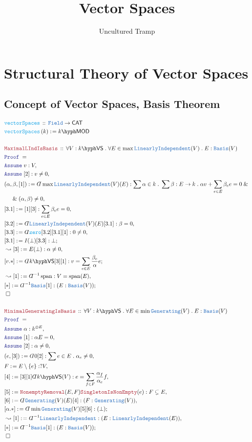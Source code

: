 \documentclass[12pt]{scrartcl}%
\title{Vector Spaces}
\author{Uncultured Tramp}
\newcommand{\TYPE}[1]{\textcolor{NavyBlue}{\mathtt{#1}}}%
\newcommand{\FUNC}[1]{\textcolor{Cerulean}{\mathtt{#1}}}%
\newcommand{\LOGIC}[1]{\textcolor{Blue}{\mathtt{#1}}}%
\newcommand{\THM}[1]{\textcolor{Maroon}{\mathtt{#1}}}%
\renewcommand{\.}{\; . \;} %
\newcommand{\de}{: \kern 0.1pc =} %
\newcommand{\Act}[1]{\left( #1 \right)} %
\newcommand{\Theorem}[2]{& \THM{#1} \, :: \, #2 \\ & \Proof = \\ } %
\newcommand{\DeclareFunc}[2]{& \FUNC{#1} \, :: \, #2 \\}%
\newcommand{\DefineFunc}[3]{&  \FUNC{#1}\Act{#2} \de #3 \\}%
\newcommand{\NewLine}{\\ & \kern 1pc}%
\newcommand{\Page}[1]{ \begin{align*} #1 \end{align*}  }%
\newcommand{ \bd }{ \ByDef }%
\renewcommand{\And}{\; \& \;}%
\newcommand{\Say}[3]{& #1 \de #2 : #3, \\} %
\newcommand{\Conclude}[3]{& #1 \de #2 : #3; \\}%
\newcommand{\Derive}[3]{& \leadsto #1 \de #2 : #3, \\} %
\newcommand{\Assume}[2]{& \LOGIC{Assume} \; #1 : #2, \\} %
\newcommand{\QED}{\; \square} %
\newcommand{\EndProof}{& \QED \\} %
\newcommand{\ByDef}{\rotatebox[origin=c]{-180}{$D$}}%
\newcommand{\Proof}{\LOGIC{Proof} \; } %
\newcommand{\CAT}{\mathsf{CAT}} %
\newcommand{\LI}{\TYPE{LinearlyIndependent}}
\DeclareMathOperator{\Span}{span} %
\newcommand{\VS}[1]{#1\hyph\mathsf{VS}} %
\newcommand{\LMOD}[1]{#1\hyph\mathsf{MOD}} %
\begin{document}
\maketitle
\normalsize
\newpage
\tableofcontents
\newpage
\section{Structural Theory of Vector Spaces}
\subsection{Concept of Vector Spaces, Basis Theorem}
\Page{
	\DeclareFunc{vectorSpaces}{\TYPE{Field} \to \CAT}
	\DefineFunc{vectorSpaces}{k}{\LMOD{k}}
	\\
	\Theorem{MaximalLIndIsBasis}
	{
		\forall V : \VS{k} \.
		\forall E \in \max \LI(V) \.
		E : \TYPE{Basis}(V) 
	}
	\Assume{v}{V}
	\Assume{[2]}{ v \neq 0}
	\Say{(\alpha,\beta,[1])}{\bd \max \LI(V)(E)  }{
		\sum \alpha \in k \. 
		\sum \beta : E \to k \.  \alpha v + \sum_{e \in E} \beta_e e = 0 \And \NewLine \And (\alpha,\beta) \neq 0               
	}
	\Say{[3.1]}{[1][3]}{ \sum_{e \in E} \beta_e e =  0  }
	\Say{[3.2]}{\bd \LI(V)(E)[3.1]}{ \beta = 0 }
	\Say{[3.3]}{\bd \FUNC{zero}[3.2][3.1][1]}{0 \neq 0}
	\Conclude{[3.1]}{I(\bot)[3.3]}{ \bot  }
	\Derive{[3]}{E(\bot)}{\alpha \neq 0}
	\Conclude{[v.*]}{\bd \VS{k} [3][1]}{v = \sum_{e \in E} \frac{\beta_e}{\alpha} e  }
	\Derive{[1]}{\bd^{-1}\Span}{V = \Span(E)}
	\Conclude{[*]}{\bd^{-1}\TYPE{Basis}[1]}{(E : \TYPE{Basis}(V))}
	\EndProof
	\\
	\Theorem{MinimalGeneratingIsBasis}
	{
		\forall V : \VS{k} \.
		\forall E \in \min \TYPE{Generating}(V) \.
		E : \TYPE{Basis}(V) 
	}
	\Assume{\alpha}{k^{\oplus E}}
	\Assume{[1]}{ \alpha E = 0}             
	\Assume{[2]}{\alpha \neq 0}
	\Say{(e,[3])}{\bd 0 [2]}{\sum e \in E \. \alpha_e \neq 0}
	\Say{F}{E\setminus\{e\}}{ ?V }
	\Say{[4]}{[3][1]\bd \VS{k}(V)}{e = \sum_{f \in F} \frac{\alpha_f}{\alpha_e} f} 
	\Say{[5]}{\THM{NonemptyRemoval}(E,F){\THM{SingletonIsNonEmpty}}(e)}{ F \subsetneq E  }
	\Say{[6]}{\bd \TYPE{Generating}(V)(E)[4] }{(F : \TYPE{Generating}(V))}
	\Conclude{[\alpha.*]}{\bd \min \TYPE{Generating}(V)[5][6] }{(\bot )}
	\Derive{[1]}{\bd^{-1}\LI}{(E : \LI(E))}
	\Conclude{[*]}{\bd^{-1}\TYPE{Basis}[1]}{(E : \TYPE{Basis}(V))}
	\EndProof
}
\end{document}

